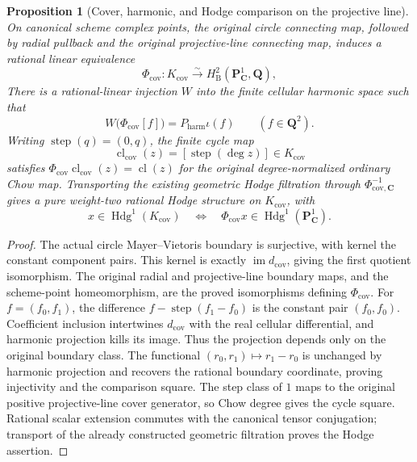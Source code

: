\documentclass[11pt]{article}
\newtheorem{proposition}[theorem]{Proposition}
\theoremstyle{definition}
\theoremstyle{remark}
\newcommand{\Q}{\mathbf Q}
\begin{document}
\begin{proposition}[Cover, harmonic, and Hodge comparison on the projective line]
\label{prop:p1-cover-harmonic-comparison}
On canonical scheme complex points, the original circle connecting map,
followed by radial pullback and the original projective-line connecting map,
induces a rational linear equivalence
\[
 \Phi_{\mathrm{cov}}:K_{\mathrm{cov}}
       \xrightarrow{\sim}H^2_{\mathrm B}(\mathbf P^1_{\mathbf C},\Q),
\]
There is a rational-linear injection
\(W\) into the finite cellular harmonic space such that
\[
 W\bigl(\Phi_{\mathrm{cov}}[f]\bigr)=P_{\mathrm{harm}}\iota(f)
 \qquad(f\in\Q^2).
\]
Writing \(\operatorname{step}(q)=(0,q)\), the finite cycle map
\[
 \operatorname{cl}_{\mathrm{cov}}(z)
   =[\operatorname{step}(\deg z)]\in K_{\mathrm{cov}}
\]
satisfies
\(\Phi_{\mathrm{cov}}\operatorname{cl}_{\mathrm{cov}}(z)
  =\operatorname{cl}(z)\) for the original degree-normalized ordinary
Chow map. Transporting the existing geometric Hodge filtration through
\(\Phi_{\mathrm{cov},\mathbf C}^{-1}\) gives a pure weight-two rational
Hodge structure on \(K_{\mathrm{cov}}\), with
\[
 x\in\operatorname{Hdg}^{1}(K_{\mathrm{cov}})
 \quad\Longleftrightarrow\quad
 \Phi_{\mathrm{cov}}x\in
       \operatorname{Hdg}^{1}(\mathbf P^1_{\mathbf C}).
\]
\end{proposition}
\begin{proof}
The actual circle Mayer--Vietoris boundary is surjective, with kernel the
constant component pairs. This kernel is exactly
\(\operatorname{im}d_{\mathrm{cov}}\), giving the first quotient
isomorphism. The original radial and projective-line boundary maps, and the
scheme-point homeomorphism, are the proved isomorphisms defining
\(\Phi_{\mathrm{cov}}\).
For \(f=(f_0,f_1)\), the difference
\(f-\operatorname{step}(f_1-f_0)\) is the constant pair \((f_0,f_0)\).
Coefficient inclusion intertwines \(d_{\mathrm{cov}}\) with the real
cellular differential, and harmonic projection kills its image. Thus the
projection depends only on the original boundary class. The functional
\((r_0,r_1)\mapsto r_1-r_0\) is unchanged by harmonic projection and
recovers the rational boundary coordinate, proving injectivity and the
comparison square. The step class of \(1\) maps to the original positive
projective-line cover generator, so Chow degree gives the cycle square.
Rational scalar extension commutes with the canonical tensor conjugation;
transport of the already constructed geometric filtration proves the Hodge
assertion.
\end{proof}
\end{document}

